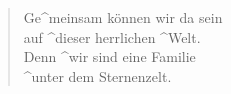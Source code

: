 \documentclass{leadsheet}
\begin{document}
\begin{song}
\begin{multicols}{2}
  \begin{verse} 
    Ge^meinsam können wir da sein \\
    auf ^dieser herrlichen ^Welt. \\
    Denn ^wir sind eine Familie \\
    ^unter dem Sternenzelt. \\
  \end{verse}

  \begin{chorus}[after-label=]\end{chorus}

  \end{multicols}
\end{song}
\end{document}
